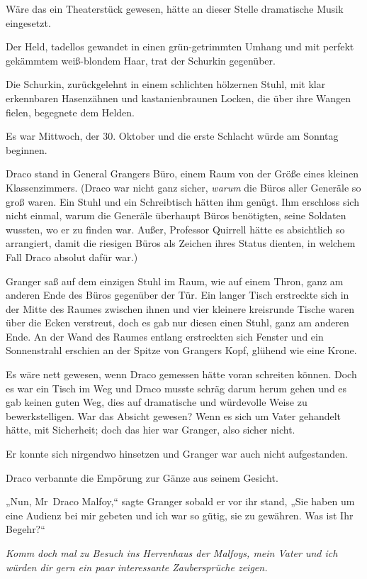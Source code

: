 {Wäre das ein Theaterstück gewesen, hätte an dieser Stelle dramatische Musik eingesetzt.

Der Held, tadellos gewandet in einen grün-getrimmten Umhang und mit perfekt gekämmtem weiß-blondem Haar, trat der Schurkin gegenüber.

Die Schurkin, zurückgelehnt in einem schlichten hölzernen Stuhl, mit klar erkennbaren Hasenzähnen und kastanienbraunen Locken, die über ihre Wangen fielen, begegnete dem Helden.

Es war Mittwoch, der 30. Oktober und die erste Schlacht würde am Sonntag beginnen.

Draco stand in General Grangers Büro, einem Raum von der Größe eines kleinen Klassenzimmers. (Draco war nicht ganz sicher, \emph{warum} die Büros aller Generäle so groß waren. Ein Stuhl und ein Schreibtisch hätten ihm genügt. Ihm erschloss sich nicht einmal, warum die Generäle überhaupt Büros benötigten, seine Soldaten wussten, wo er zu finden war. Außer, Professor Quirrell hätte es absichtlich so arrangiert, damit die riesigen Büros als Zeichen ihres Status dienten, in welchem Fall Draco absolut dafür war.)

Granger saß auf dem einzigen Stuhl im Raum, wie auf einem Thron, ganz am anderen Ende des Büros gegenüber der Tür. Ein langer Tisch erstreckte sich in der Mitte des Raumes zwischen ihnen und vier kleinere kreisrunde Tische waren über die Ecken verstreut, doch es gab nur diesen einen Stuhl, ganz am anderen Ende. An der Wand des Raumes entlang erstreckten sich Fenster und ein Sonnenstrahl erschien an der Spitze von Grangers Kopf, glühend wie eine Krone.

Es wäre nett gewesen, wenn Draco gemessen hätte voran schreiten können. Doch es war ein Tisch im Weg und Draco musste schräg darum herum gehen und es gab keinen guten Weg, dies auf dramatische und würdevolle Weise zu bewerkstelligen. War das Absicht gewesen? Wenn es sich um Vater gehandelt hätte, mit Sicherheit; doch das hier war Granger, also sicher nicht.

Er konnte sich nirgendwo hinsetzen und Granger war auch nicht aufgestanden.

Draco verbannte die Empörung zur Gänze aus seinem Gesicht.

„Nun, Mr~Draco Malfoy,“ sagte Granger sobald er vor ihr stand, „Sie haben um eine Audienz bei mir gebeten und ich war so gütig, sie zu gewähren. Was ist Ihr Begehr?“

\emph{Komm doch mal} \emph{zu Besuch ins Herrenhaus der Malfoys, mein Vater und ich würden dir gern ein paar interessante Zaubersprüche zeigen.}

}
